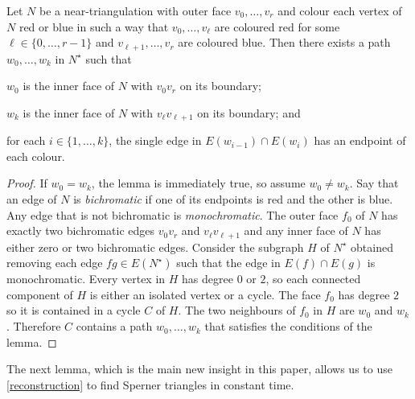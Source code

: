 \documentclass{patmorin}
\begin{document}
\begin{lem}\label{baby_sperner}
  Let $N$ be a near-triangulation with outer face $v_0,\ldots,v_r$ and colour each vertex of $N$ red or blue in such a way that $v_0,\ldots,v_\ell$ are coloured red for some $\ell\in\{0,\ldots,r-1\}$ and $v_{\ell+1},\ldots,v_r$ are coloured blue.  Then there exists a path $w_0,\ldots,w_k$ in $N^\star$ such that
  \begin{compactenum}
    \item $w_0$ is the inner face of $N$ with $v_0v_r$ on its boundary;
    \item $w_k$ is the inner face of $N$ with $v_{\ell}v_{\ell+1}$ on its boundary; and
    \item for each $i\in\{1,\ldots,k\}$, the single edge in $E(w_{i-1})\cap E(w_i)$ has an endpoint of each colour.
  \end{compactenum}
\end{lem}

\begin{proof}
  If $w_0=w_k$, the lemma is immediately true, so assume $w_0\neq w_k$.
  Say that an edge of $N$ is \emph{bichromatic} if one of its endpoints is red and the other is blue.  Any edge that is not bichromatic is \emph{monochromatic}.  The outer face $f_0$ of $N$ has exactly two bichromatic edges $v_0v_r$ and $v_{\ell}v_{\ell+1}$ and any inner face of $N$ has either zero or two bichromatic edges.  Consider the subgraph $H$ of $N^\star$ obtained removing each edge $fg\in E(N^\star)$ such that the edge in $E(f)\cap E(g)$ is monochromatic.  Every vertex in $H$ has degree $0$ or $2$, so each connected component of $H$ is either an isolated vertex or a cycle.  The face $f_0$ has degree $2$ so it is contained in a cycle $C$ of $H$.  The two neighbours of $f_0$ in $H$ are $w_0$ and $w_k$. Therefore $C$ contains a path $w_0,\ldots,w_k$ that satisfies the conditions of the lemma.
\end{proof}

The next lemma, which is the main new insight in this paper, allows us to use \cref{reconstruction} to find Sperner triangles in constant time.
\end{document}
